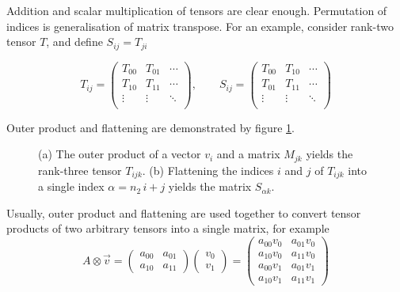 Addition and scalar multiplication of tensors are clear enough. 
Permutation of indices is generalisation of matrix transpose. 
For an example, consider rank-two tensor $T$, and define $S_{ij} = T_{ji}$

\begin{equation*}
	T_{ij} =
	\begin{pmatrix}
		T_{00} & T_{01} & \cdots  \\
		T_{10} & T_{11} & \cdots \\ 
		\vdots & \vdots & \ddots \\
	\end{pmatrix}, \qquad
	S_{ij} =
	\begin{pmatrix}
		T_{00} & T_{10} & \cdots  \\
		T_{01} & T_{11} & \cdots \\ 
		\vdots & \vdots & \ddots \\
	\end{pmatrix}
\end{equation*}

Outer product and flattening are demonstrated by figure \ref{fig:outer-flatten}.

\begin{figure}[ht]
\centering

\caption{(a) The outer product of a vector $v_i$ and a matrix $M_{jk}$ yields the rank-three tensor $T_{ijk}$. (b) Flattening the indices $i$ and $j$ of $T_{ijk}$ into a single index $\alpha = n_2\, i + j$ yields the matrix $S_{\alpha k}$.}
\label{fig:outer-flatten}
\end{figure}

Usually, outer product and flattening are used together to convert tensor products of two arbitrary tensors into a single matrix, for example
\begin{equation}
	A \otimes \vec{v} = 
	\begin{pmatrix}
		a_{00} & a_{01}\\
		a_{10} & a_{11}
	\end{pmatrix}
	\begin{pmatrix}
		v_0 \\ v_1	
	\end{pmatrix}
	= 
	\begin{pmatrix}
		a_{00} v_0 & a_{01} v_0 \\
		a_{10} v_0 & a_{11} v_0 \\
		a_{00} v_1 & a_{01} v_1 \\
		a_{10} v_1 & a_{11} v_1
	\end{pmatrix}
\end{equation}

